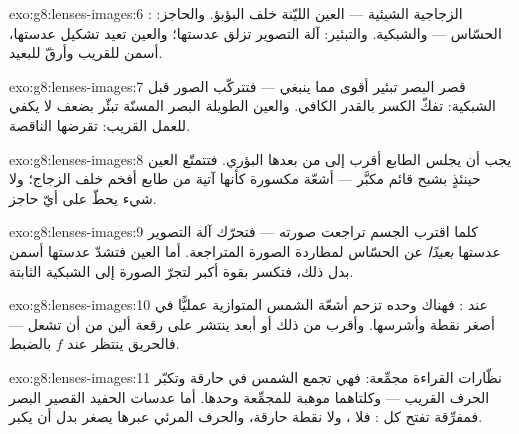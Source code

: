 \begin{solution}{exo:g8:lenses-images:6}
:  الزجاجية الشيئية ---  العين الليّنة خلف
البؤبؤ. والحاجز: الحسّاس --- والشبكية. والتبئير: آلة التصوير
تزلق عدستها؛ والعين تعيد تشكيل عدستها، أسمن للقريب وأرقّ
للبعيد.
\end{solution}

\begin{solution}{exo:g8:lenses-images:7}
قصر البصر تبئير أقوى مما ينبغي --- فتتركّب الصور قبل الشبكية:
 تفكّ الكسر بالقدر الكافي. والعين الطويلة البصر
المسنّة تبئّر بضعف لا يكفي للعمل القريب:  تقرضها
 الناقصة.
\end{solution}

\begin{solution}{exo:g8:lenses-images:8}
يجب أن يجلس الطابع أقرب إلى  من بعدها البؤري. فتتمتّع
العين حينئذٍ بشبح قائم مكبَّر --- أشعّة مكسورة كأنها آتية من
طابع أفخم خلف الزجاج؛ ولا شيء يحطّ على أيّ حاجز.
\end{solution}

\begin{solution}{exo:g8:lenses-images:9}
كلما اقترب الجسم تراجعت صورته --- فتحرّك آلة التصوير عدستها
\emph{بعيدًا} عن الحسّاس لمطاردة الصورة المتراجعة. أما العين
فتشدّ عدستها أسمن بدل ذلك، فتكسر بقوة أكبر لتجرّ الصورة إلى
الشبكية الثابتة.
\end{solution}

\begin{solution}{exo:g8:lenses-images:10}
عند : فهناك وحده تزحم  أشعّة الشمس
المتوازية عمليًّا في أصغر نقطة وأشرسها. وأقرب من ذلك أو أبعد
ينتشر  على رقعة ألين من أن تشعل --- فالحريق ينتظر عند
$f$ بالضبط.
\end{solution}

\begin{solution}{exo:g8:lenses-images:11}
نظّارات القراءة مجمِّعة: فهي تجمع  الشمس في  حارقة
وتكبّر الحرف القريب --- وكلتاهما موهبة للمجمِّعة وحدها. أما
عدسات الحفيد القصير البصر فمفرِّقة تفتح كل : فلا ، ولا
نقطة حارقة، والحرف المرئي عبرها يصغر بدل أن يكبر.
\end{solution}

